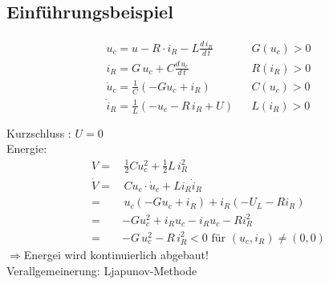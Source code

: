 \documentclass[ngerman]{tudscrreprt}
\begin{document}
\subsection{Einführungsbeispiel}
\begin{figure}[H] 
  \centering 
  \def\svgwidth{250pt} 
   
\end{figure} 
\begin{equation*}
\begin{matrix}
u_c = u - R\cdot i_R - L \frac{d\,i_R}{d\,t}&& G(u_c)> 0\\
i_R = G\,u_c + C \frac{d\,u_c}{d\,t} && R(i_R) > 0\\
\dot u_c = \frac{1}{C}(-G u_c + i_R) && C(u_c) >0\\
\dot i_R = \frac{1}{L} (-u_c - R\, i_R + U) && L(i_R)> 0 \\
&& \\
\end{matrix}
\end{equation*}
Kurzschluss : $U=0$\\
Energie: 
\begin{align*}
V = &\,\frac{1}{2} C u_c^2 + \frac{1}{2} L \, i_R^2\\
\dot V =& \,C u_c \cdot \dot u_c + L i_R \dot i_R \\
=&\, u_c (-G u_c + i_R) + i_R (-U_L -R i_R)\\
=& -G u_c^2 + i_R u_c - i_R u_c - R i_R^2\\
=& -G \,u_c^2 - R\,i_R^2 < 0 \text{  für } (u_c, i_R) \ne (0,0)
\end{align*}
$\Rightarrow $Energei wird kontinuierlich abgebaut!\\
Verallgemeinerung: Ljapunov-Methode
\end{document}
